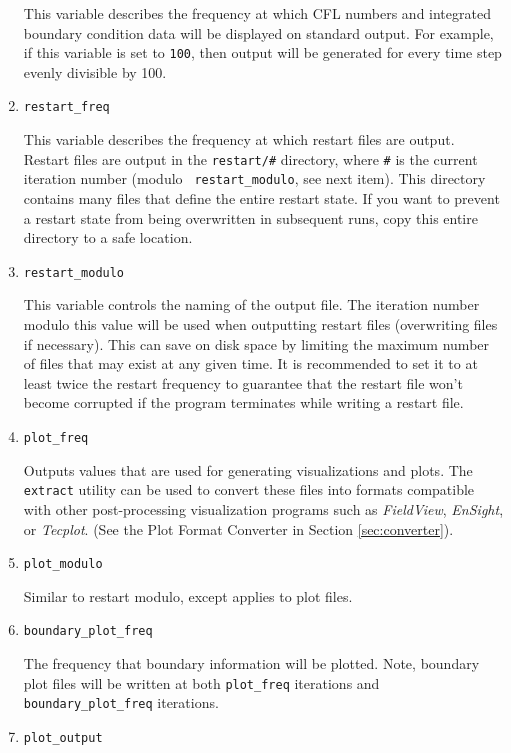 \documentclass{article}
\begin{document}
\begin{enumerate}
  This variable describes the frequency at which CFL numbers and integrated
  boundary condition data will be displayed on standard output.  For
  example, if this variable is set to {\tt 100}, then output will be
  generated for every time step evenly divisible by 100.
  
\item {\tt restart\_freq} 

  This variable describes the frequency at which restart files are output.
  Restart files are output in the {\tt restart/\#} directory, where
  {\tt \#} is the current iteration number (modulo {\tt
    restart\_modulo}, see next item).  This directory contains many
  files that define the entire restart state.  If you want to prevent a
  restart state from being overwritten in subsequent runs, copy this
  entire directory to a safe location.  

\item {\tt restart\_modulo} 

This variable controls the naming of the output file.  The iteration
number modulo this value will be used when outputting restart files
(overwriting files if necessary).  This can save on disk space by
limiting the maximum number of files that may exist at any given time.
It is recommended to set it to at least twice the restart frequency to
guarantee that the restart file won't become corrupted if the program
terminates while writing a restart file.


\item {\tt plot\_freq}

Outputs values that are used for generating visualizations and plots.
The {\tt extract} utility can be used to convert these files into
formats compatible with other post-processing visualization programs
such as {\em FieldView}, {\em EnSight}, or {\em Tecplot}. (See the Plot Format Converter in Section
\ref{sec:converter}).

\item {\tt plot\_modulo}

Similar to restart modulo, except applies to plot files.

\item {\tt boundary\_plot\_freq}

  The frequency that boundary information will be plotted.  Note,
  boundary plot files will be written at both {\tt plot\_freq}
  iterations and {\tt boundary\_plot\_freq} iterations.

\item {\tt plot\_output}


\end{enumerate}
\end{document}
